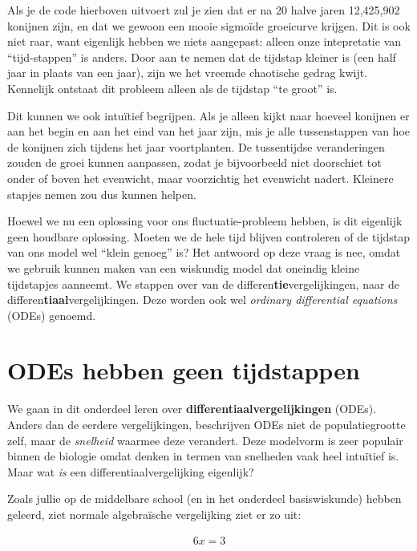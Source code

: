 \documentclass[
  a4paper,
]{scrbook}
\theoremstyle{definition}
\theoremstyle{remark}
\begin{document}
Als je de code hierboven uitvoert zul je zien dat er na 20 halve jaren
12,425,902 konijnen zijn, en dat we gewoon een mooie sigmoïde groeicurve
krijgen. Dit is ook niet raar, want eigenlijk hebben we niets aangepast:
alleen onze intepretatie van ``tijd-stappen'' is anders. Door aan te
nemen dat de tijdstap kleiner is (een half jaar in plaats van een jaar),
zijn we het vreemde chaotische gedrag kwijt. Kennelijk ontstaat dit
probleem alleen als de tijdstap ``te groot'' is.

Dit kunnen we ook intuïtief begrijpen. Als je alleen kijkt naar hoeveel
konijnen er aan het begin en aan het eind van het jaar zijn, mis je alle
tussenstappen van hoe de konijnen zich tijdens het jaar voortplanten. De
tussentijdse veranderingen zouden de groei kunnen aanpassen, zodat je
bijvoorbeeld niet doorschiet tot onder of boven het evenwicht, maar
voorzichtig het evenwicht nadert. Kleinere stapjes nemen zou dus kunnen
helpen.

Hoewel we nu een oplossing voor ons fluctuatie-probleem hebben, is dit
eigenlijk geen houdbare oplossing. Moeten we de hele tijd blijven
controleren of de tijdstap van ons model wel ``klein genoeg'' is? Het
antwoord op deze vraag is nee, omdat we gebruik kunnen maken van een
wiskundig model dat oneindig kleine tijdstapjes aanneemt. We stappen
over van de differen\textbf{tie}vergelijkingen, naar de
differen\textbf{tiaal}vergelijkingen. Deze worden ook wel \emph{ordinary
differential equations} (ODEs) genoemd.

\hypertarget{odes-hebben-geen-tijdstappen}{%
\section{ODEs hebben geen
tijdstappen}\label{odes-hebben-geen-tijdstappen}}

We gaan in dit onderdeel leren over \textbf{differentiaalvergelijkingen}
(ODEs). Anders dan de eerdere vergelijkingen, beschrijven ODEs niet de
populatiegrootte zelf, maar de \emph{snelheid} waarmee deze verandert.
Deze modelvorm is zeer populair binnen de biologie omdat denken in
termen van snelheden vaak heel intuïtief is. Maar wat \emph{is} een
differentiaalvergelijking eigenlijk?

Zoals jullie op de middelbare school (en in het onderdeel basiswiskunde)
hebben geleerd, ziet normale algebraïsche vergelijking ziet er zo uit:

\begin{align}
    6x=3
\end{align}
\end{document}
